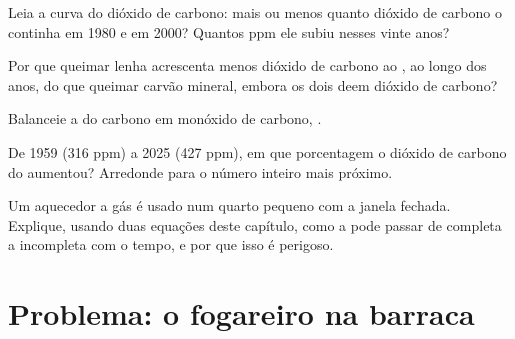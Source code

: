 \begin{exercise}[$\star\star$]\label{exo:g8:combustion-and-fuels:8}
Leia a curva do dióxido de carbono: mais ou menos quanto dióxido de
carbono o  continha em 1980 e em 2000? Quantos ppm ele subiu nesses
vinte anos?
\end{exercise}

\begin{exercise}[$\star\star$]\label{exo:g8:combustion-and-fuels:9}
Por que queimar lenha acrescenta menos dióxido de carbono ao , ao
longo dos anos, do que queimar carvão mineral, embora os dois deem
dióxido de carbono?
\end{exercise}

\begin{exercise}[$\star\star$]\label{exo:g8:combustion-and-fuels:10}
Balanceie a  do carbono em monóxido de carbono,
. %
\end{exercise}

\begin{exercise}[$\star\star\star$]\label{exo:g8:combustion-and-fuels:11}
De 1959 (316 ppm) a 2025 (427 ppm), em que porcentagem o dióxido de
carbono do  aumentou? Arredonde para o número inteiro mais próximo.
\end{exercise}

\begin{exercise}[$\star\star\star$]\label{exo:g8:combustion-and-fuels:12}
Um aquecedor a gás é usado num quarto pequeno com a janela fechada.
Explique, usando duas equações deste capítulo, como a  pode
passar de completa a incompleta com o tempo, e por que isso é perigoso.
\end{exercise}

\section{Problema: o fogareiro na barraca}

